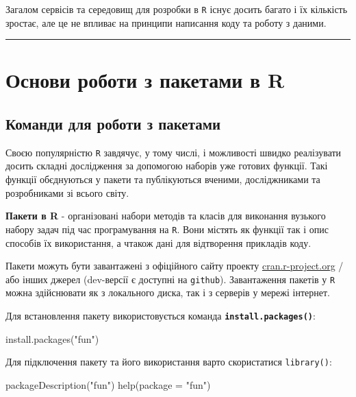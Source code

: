\documentclass[
]{book}
\newenvironment{Shaded}{\begin{snugshade}}{\end{snugshade}}
\newcommand{\AttributeTok}[1]{\textcolor[rgb]{0.77,0.63,0.00}{#1}}
\newcommand{\FunctionTok}[1]{\textcolor[rgb]{0.00,0.00,0.00}{#1}}
\newcommand{\NormalTok}[1]{#1}
\newcommand{\StringTok}[1]{\textcolor[rgb]{0.31,0.60,0.02}{#1}}
\begin{document}
Загалом сервісів та середовищ для розробки в \texttt{R} існує досить багато і їх кількість зростає, але це не впливає на принципи написання коду та роботу з даними.

\begin{center}\rule{0.5\linewidth}{0.5pt}\end{center}

\hypertarget{chapter14}{%
\section{Основи роботи з пакетами в R}\label{chapter14}}

\hypertarget{chapter141}{%
\subsection{Команди для роботи з пакетами}\label{chapter141}}

Своєю популярністю \texttt{R} завдячує, у тому числі, і можливості швидко реалізувати досить складні дослідження за допомогою наборів уже готових функції. Такі функції обєднуються у пакети та публікуються вченими, досліджниками та розробниками зі всього світу.

\textbf{Пакети в R} - організовані набори методів та класів для виконання вузького набору задач під час програмування на \texttt{R}. Вони містять як функції так і опис способів їх використання, а чтакож дані для відтворення прикладів коду.

Пакети можуть бути завантажені з офіційного сайту проекту \href{https://cran.r-project.org/web/packages/available_packages_by_name.html}{cran.r-project.org} / \citep{R-base} або інших джерел (dev-версії є доступні на \texttt{github}). Завантаження пакетів у \texttt{R} можна здійснювати як з локального диска, так і з серверів у мережі інтернет.

Для встановлення пакету використовується команда \textbf{\texttt{install.packages()}}:

\begin{Shaded}
\begin{Highlighting}[]
\FunctionTok{install.packages}\NormalTok{(}\StringTok{"fun"}\NormalTok{)}
\end{Highlighting}
\end{Shaded}

Для підключення пакету та його використання варто скористатися \texttt{library()}:

\begin{Shaded}
\begin{Highlighting}[]
\FunctionTok{packageDescription}\NormalTok{(}\StringTok{"fun"}\NormalTok{)}
\FunctionTok{help}\NormalTok{(}\AttributeTok{package =} \StringTok{"fun"}\NormalTok{)}
\end{Highlighting}
\end{Shaded}
\end{document}
